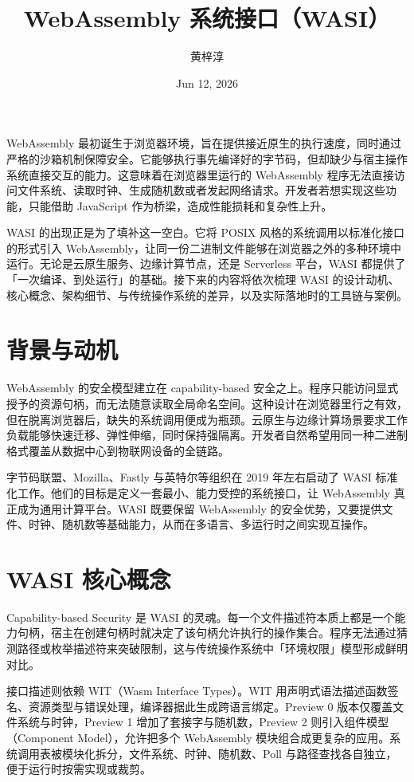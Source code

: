 \title{WebAssembly 系统接口（WASI）}
\author{黄梓淳}
\date{Jun 12, 2026}
\maketitle
WebAssembly 最初诞生于浏览器环境，旨在提供接近原生的执行速度，同时通过严格的沙箱机制保障安全。它能够执行事先编译好的字节码，但却缺少与宿主操作系统直接交互的能力。这意味着在浏览器里运行的 WebAssembly 程序无法直接访问文件系统、读取时钟、生成随机数或者发起网络请求。开发者若想实现这些功能，只能借助 JavaScript 作为桥梁，造成性能损耗和复杂性上升。\par
WASI 的出现正是为了填补这一空白。它将 POSIX 风格的系统调用以标准化接口的形式引入 WebAssembly，让同一份二进制文件能够在浏览器之外的多种环境中运行。无论是云原生服务、边缘计算节点，还是 Serverless 平台，WASI 都提供了「一次编译、到处运行」的基础。接下来的内容将依次梳理 WASI 的设计动机、核心概念、架构细节、与传统操作系统的差异，以及实际落地时的工具链与案例。\par
\chapter{背景与动机}
WebAssembly 的安全模型建立在 capability-based 安全之上。程序只能访问显式授予的资源句柄，而无法随意读取全局命名空间。这种设计在浏览器里行之有效，但在脱离浏览器后，缺失的系统调用便成为瓶颈。云原生与边缘计算场景要求工作负载能够快速迁移、弹性伸缩，同时保持强隔离。开发者自然希望用同一种二进制格式覆盖从数据中心到物联网设备的全链路。\par
字节码联盟、Mozilla、Fastly 与英特尔等组织在 2019 年左右启动了 WASI 标准化工作。他们的目标是定义一套最小、能力受控的系统接口，让 WebAssembly 真正成为通用计算平台。WASI 既要保留 WebAssembly 的安全优势，又要提供文件、时钟、随机数等基础能力，从而在多语言、多运行时之间实现互操作。\par
\chapter{WASI 核心概念}
Capability-based Security 是 WASI 的灵魂。每一个文件描述符本质上都是一个能力句柄，宿主在创建句柄时就决定了该句柄允许执行的操作集合。程序无法通过猜测路径或枚举描述符来突破限制，这与传统操作系统中「环境权限」模型形成鲜明对比。\par
接口描述则依赖 WIT（Wasm Interface Types）。WIT 用声明式语法描述函数签名、资源类型与错误处理，编译器据此生成跨语言绑定。Preview 0 版本仅覆盖文件系统与时钟，Preview 1 增加了套接字与随机数，Preview 2 则引入组件模型（Component Model），允许把多个 WebAssembly 模块组合成更复杂的应用。系统调用表被模块化拆分，文件系统、时钟、随机数、Poll 与路径查找各自独立，便于运行时按需实现或裁剪。\par
